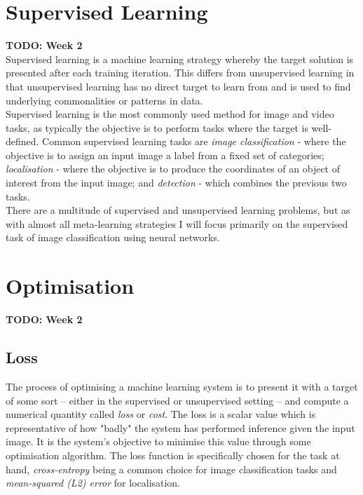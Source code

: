 \documentclass{report}
\begin{document}
	\section{Supervised Learning}
	\textbf{TODO: Week 2} \\
	Supervised learning is a machine learning strategy whereby the target solution is presented after each training iteration. This differs from unsupervised learning in that unsupervised learning has no direct target to learn from and is used to find underlying commonalities or patterns in data. \\
	Supervised learning is the most commonly used method for image and video tasks, as typically the objective is to perform tasks where the target is well-defined. Common supervised learning tasks are \textit{image classification} - where the objective is to assign an input image a label from a fixed set of categories; \textit{localisation} - where the objective is to produce the coordinates of an object of interest from the input image; and \textit{detection} - which combines the previous two tasks. \\
	There are a multitude of supervised and unsupervised learning problems, but as with almost all meta-learning strategies I will focus primarily on the supervised task of image classification using neural networks.
	

	\section{Optimisation}
	\textbf{TODO: Week 2} \\
	\subsection{Loss}
	The process of optimising a machine learning system is to present it with a target of some sort -- either in the supervised or unsupervised setting -- and compute a numerical quantity called \textit{loss} or \textit{cost}. The loss is a scalar value which is representative of how "badly" the system has performed inference given the input image. It is the system's objective to minimise this value through some optimisation algorithm. The loss function is specifically chosen for the task at hand, \textit{cross-entropy} being a common choice for image classification tasks and \textit{mean-squared (L2) error}  for localisation. \\
	
\end{document}
